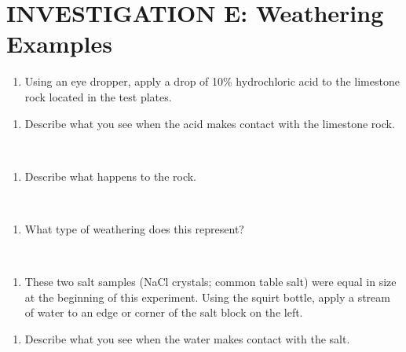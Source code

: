 \documentclass[
  letterpaper,
  twocolumn,
  portrait]{scrbook}
\providecommand{\tightlist}{%
  \setlength{\itemsep}{0pt}\setlength{\parskip}{0pt}}\usepackage{longtable,booktabs,array}
\begin{document}
\hypertarget{investigation-e-weathering-examples}{%
\section{INVESTIGATION E: Weathering
Examples}\label{investigation-e-weathering-examples}}

\begin{enumerate}
\def\labelenumi{\arabic{enumi}.}
\tightlist
\item
  Using an eye dropper, apply a drop of 10\% hydrochloric acid to the
  limestone rock located in the test plates.
\end{enumerate}

\begin{enumerate}
\def\labelenumi{\alph{enumi}.}
\tightlist
\item
  Describe what you see when the acid makes contact with the limestone
  rock.
\end{enumerate}

~ ~ ~

\begin{enumerate}
\def\labelenumi{\alph{enumi}.}
\setcounter{enumi}{1}
\tightlist
\item
  Describe what happens to the rock.
\end{enumerate}

~ ~ ~

\begin{enumerate}
\def\labelenumi{\alph{enumi}.}
\setcounter{enumi}{2}
\tightlist
\item
  What type of weathering does this represent?
\end{enumerate}

~ ~ ~

\begin{enumerate}
\def\labelenumi{\arabic{enumi}.}
\setcounter{enumi}{1}
\tightlist
\item
  These two salt samples (NaCl crystals; common table salt) were equal
  in size at the beginning of this experiment. Using the squirt bottle,
  apply a stream of water to an edge or corner of the salt block on the
  left.
\end{enumerate}

\begin{enumerate}
\def\labelenumi{\alph{enumi}.}
\tightlist
\item
  Describe what you see when the water makes contact with the salt.
\end{enumerate}

~ ~ ~
\end{document}
